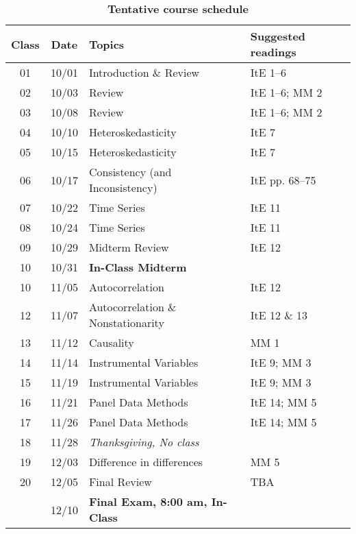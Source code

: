 \documentclass[10pt]{article}
\newcommand{\ra}[1]{\renewcommand{\arraystretch}{#1}}
\begin{document}
\begin{table}[htb]
  \caption*{\textbf{Tentative course schedule}}
  \ra{1.5}
  \begin{tabular}{@{\extracolsep{1cm}} c c l l @{}}
    \toprule
    \textbf{Class} & \textbf{Date} & \textbf{Topics} & \textbf{Suggested readings}  \\ \toprule
    01 & 10/01 & Introduction \& Review & ItE 1--6 \\
    02 & 10/03 & Review & ItE 1--6; MM 2 \\
    03 & 10/08 & Review & ItE 1--6; MM 2 \\
    04 & 10/10 & Heteroskedasticity & ItE 7 \\
    05 & 10/15 & Heteroskedasticity & ItE 7 \\
    06 & 10/17 & Consistency (and Inconsistency) & ItE pp. 68--75  \\
    07 & 10/22 &  Time Series & ItE 11\\
    08 & 10/24 & Time Series & ItE 11\\
    09 & 10/29 & Midterm Review & ItE 12\\ \midrule
    10 & 10/31 & \textbf{In-Class Midterm} & \\ \midrule
    10 & 11/05 & Autocorrelation & ItE 12 \\
    12 & 11/07 & Autocorrelation \& Nonstationarity & ItE 12 \& 13 \\
    13 & 11/12 & Causality & MM 1 \\
    14 & 11/14 & Instrumental Variables & ItE 9; MM 3 \\
    15 & 11/19 & Instrumental Variables & ItE 9; MM 3 \\
    16 & 11/21 & Panel Data Methods & ItE 14; MM 5 \\ 
    17 & 11/26 & Panel Data Methods & ItE 14; MM 5 \\
    18 & 11/28 & \textit{Thanksgiving, No class}  & \\
    19 & 12/03 & Difference in differences & MM 5 \\
    20 & 12/05 & Final Review & TBA \\ \midrule
       & 12/10 & \textbf{Final Exam, 8:00 am, In-Class} & \\
    \bottomrule
  \end{tabular}
\end{table}
\end{document}
